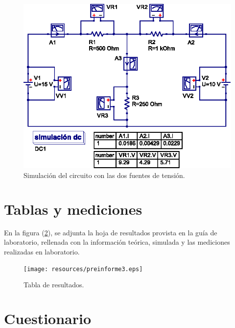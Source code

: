 \documentclass[letter,11pt]{article}
\begin{document}
\newpage

\begin{figure}[!h]
\centering
\includegraphics[scale=1.27]{simulation/practica6.eps}
\caption{Simulación del circuito con las dos fuentes de tensión.}
\label{simulacion3}
\end{figure}

\newpage

\section{Tablas y mediciones}
En la figura (\ref{tablas}), se adjunta la hoja de resultados provista en la
guía de laboratorio, rellenada con la información teórica, simulada y las
mediciones realizadas en laboratorio.

\begin{figure}[!h]
\centering
\texttt{[image: resources/preinforme3.eps]}
\caption{Tabla de resultados.}
\label{tablas}
\end{figure}

\section{Cuestionario}
\end{document}
